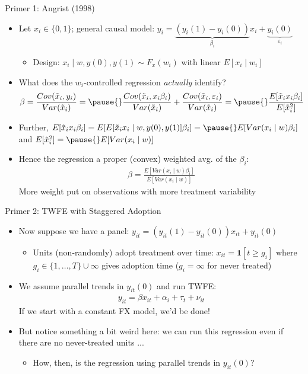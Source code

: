 \documentclass[11pt,english]{beamer}
\begin{document}
\begin{frame}{Primer 1: Angrist (1998)}
\vspace{0.2cm}
\begin{itemize}
\item Let $x_i\in\{0,1\}$; general causal model: $y_i=\underbrace{(y_i(1)-y_i(0))}_{\beta_i}x_i+\underbrace{y_i(0)}_{\varepsilon_i}$\smallskip
\begin{itemize}
\item Design: $x_i\mid w,y(0),y(1)\sim F_x(w_i)$ with linear $E[x_i\mid w_i]$ 
\end{itemize}\bigskip\pause{}
\item What does the $w_i$-controlled regression \emph{actually} identify? \pause{}
\begin{align*}
\beta&=\frac{Cov(\tilde{x}_i,y_i)}{Var(\tilde{x}_i)}=\pause{}\frac{Cov(\tilde{x}_i,x_i\beta_i)}{Var(\tilde{x}_i)}+\frac{Cov(\tilde{x}_i,\varepsilon_i)}{Var(\tilde{x}_i)}=\pause{}\frac{E[\tilde{x}_ix_i\beta_i]}{E[\tilde{x}_i^2]}
\end{align*}\pause{}
\item Further, $E[\tilde{x}_ix_i\beta_i]=E[E[\tilde{x}_ix_i\mid w, y(0),y(1)]\beta_i]=\pause{}E[Var(x_i\mid w)\beta_i]$ and $E[\tilde{x}_i^2]=\pause{}E[Var(x_i\mid w)]$\pause{}\medskip
\item Hence the regression a proper (convex) weighted avg. of the $\beta_i$:
\begin{align*}
\beta=\frac{E[Var(x_i\mid w)\beta_i]}{E[Var(x_i\mid w)]}
\end{align*}
More weight put on observations with more treatment variability
\end{itemize}
\end{frame}

\begin{frame}{Primer 2: TWFE with Staggered Adoption}

\begin{itemize}
\item Now suppose we have a panel: $y_{it}=(y_{it}(1)-y_{it}(0))x_{it}+y_{it}(0)$\smallskip
\begin{itemize}
\item Units (non-randomly) adopt treatment over time: $x_{it}=\mathbf{1}[t\ge g_i]$ where  $g_i\in\{1,\dots,T\}\cup \infty$ gives adoption time ($g_i=\infty$ for never treated)
\end{itemize}\pause{}\bigskip
\item We assume parallel trends in $y_{it}(0)$ and run TWFE:
\begin{align*}
y_{it}=\beta x_{it}+\alpha_i+\tau_t+\nu_{it}
\end{align*}
If we start with a constant FX model, we'd be done!\pause{}\bigskip
\item But notice something a bit weird here: we can run this regression even if there are no never-treated units ...
\begin{itemize}
\item How, then, is the regression using parallel trends in $y_{it}(0)$?
\end{itemize}
\end{itemize}
\end{frame}
\end{document}
